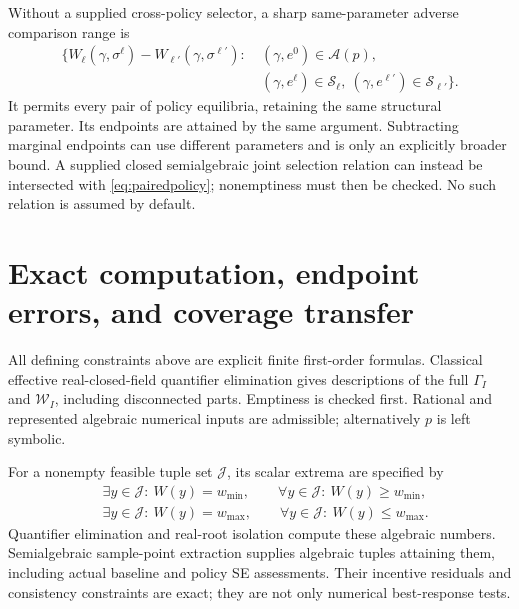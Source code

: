 \documentclass[11pt,a4paper]{article}
\numberwithin{equation}{section}
\theoremstyle{definition}
\begin{document}
Without a supplied cross-policy selector, a sharp same-parameter
adverse comparison range is
\begin{equation}\label{eq:pairedpolicy}
 \begin{split}
 \{W_\ell(\gamma,\sigma^\ell)-W_{\ell'}(\gamma,\sigma^{\ell'}):\
 &(\gamma,e^0)\in\mathcal A(p),\\
 &(\gamma,e^\ell)\in\mathcal S_\ell,\
   (\gamma,e^{\ell'})\in\mathcal S_{\ell'}\}.
 \end{split}
\end{equation}
It permits every pair of policy equilibria, retaining the same
structural parameter. Its endpoints are attained by the same argument.
Subtracting marginal endpoints can use different parameters and
is only an explicitly broader bound. A supplied closed semialgebraic
joint selection relation can instead be intersected with
\eqref{eq:pairedpolicy}; nonemptiness must then be checked.
No such relation is assumed by default.

\section{Exact computation, endpoint errors, and coverage transfer}
\label{sec:qe}
All defining constraints above are explicit finite first-order formulas.
Classical effective real-closed-field quantifier elimination
\cite{Basu} gives descriptions of the full \(\Gamma_I\) and
\(\mathcal W_I\), including disconnected parts.
Emptiness is checked first. Rational and represented algebraic
numerical inputs are admissible; alternatively \(p\) is left symbolic.

For a nonempty feasible tuple set \(\mathcal J\), its scalar extrema
are specified by
\begin{equation}\label{eq:endpointformula}
 \begin{aligned}
 &\exists y\in\mathcal J:\ W(y)=w_{\min},\qquad
   \forall y\in\mathcal J:\ W(y)\ge w_{\min},\\
 &\exists y\in\mathcal J:\ W(y)=w_{\max},\qquad
   \forall y\in\mathcal J:\ W(y)\le w_{\max}.
 \end{aligned}
\end{equation}
Quantifier elimination and real-root isolation compute these algebraic
numbers. Semialgebraic sample-point extraction supplies algebraic
tuples attaining them, including actual baseline and policy SE
assessments. Their incentive residuals and consistency constraints
are exact; they are not only numerical best-response tests.
\end{document}
